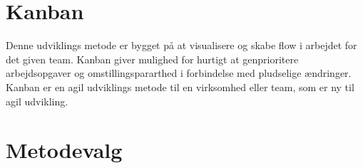 \section{Kanban}\label{sec:kanban}
Denne udviklings metode er bygget på at visualisere og skabe flow i arbejdet for det given team. Kanban giver mulighed for hurtigt at 
genprioritere arbejdsopgaver og omstillingspararthed i forbindelse med pludselige ændringer.  \\

Kanban er en agil udviklings metode til en virksomhed eller team, som er ny til agil udvikling.

\section{Metodevalg}\label{sec:valgafvaektoej}
